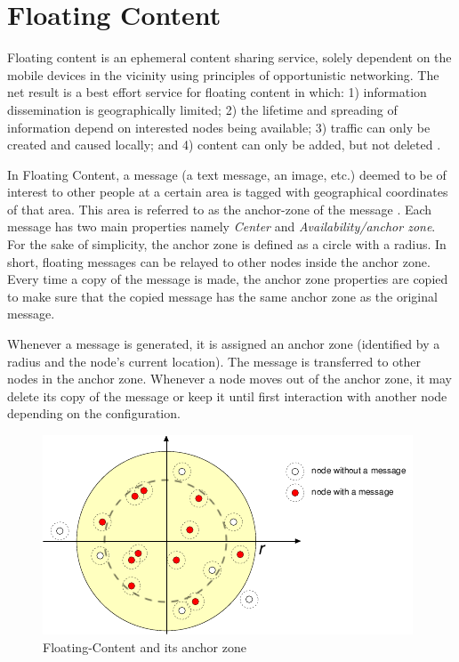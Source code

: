 \section{Floating Content}
\label{section:floating-content}
Floating content is an ephemeral content sharing service, solely dependent on the mobile devices in the vicinity using principles of opportunistic networking. The net result is a best effort service for floating content in which: 1) information dissemination is geographically limited; 2) the lifetime and spreading of information depend on interested nodes being available; 3) traffic can only be created and caused locally; and 4) content can only be added, but not deleted \cite{floating-content}.

In Floating Content, a message (a text message, an image, etc.) deemed to be of interest to other people at a certain area is tagged with geographical coordinates of that area. This area is referred to as the anchor-zone of the message \cite{floating-content-1}. Each message has two main properties namely \textit{Center} and \textit{Availability/anchor zone}. For the sake of simplicity, the anchor zone is defined as a circle with a radius. In short, floating messages can be relayed to other nodes inside the anchor zone. Every time a copy of the message is made, the anchor zone properties are copied to make sure that the copied message has the same anchor zone as the original message.

Whenever a message is generated, it is assigned an anchor zone (identified by a radius and the node's current location). The message is transferred to other nodes in the anchor zone. Whenever a node moves out of the anchor zone, it may delete its copy of the message or keep it until first interaction with another node depending on the configuration.
\begin{figure}[h]
\centering
\includegraphics{./figures/anchor-zone}
\caption{Floating-Content and its anchor zone \cite{floating-content}}
\end{figure}
\newpage
